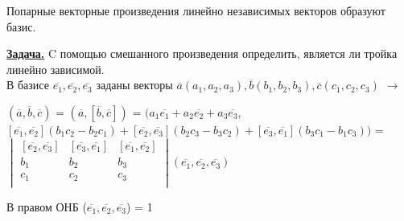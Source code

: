 \begin{corollary}
    Попарные векторные произведения линейно независимых векторов образуют базис.
\end{corollary}

\underline{\textbf{Задача.}} C помощью смешанного произведения определить, является ли тройка линейно зависимой.\\

В базисе $\overline{e_1}, \overline{e_2}, \overline{e_3}$ заданы векторы $\overline{a}(a_1, a_2, a_3), \overline{b}(b_1, b_2, b_3), \overline{c}(c_1, c_2, c_3)$ $\longrightarrow$

\begin{center}
    $(\overline{a}, \overline{b}, \overline{c})$ = $(\overline{a}, [\overline{b}, \overline{c}])$ = $(a_1\overline{e_1} + a_2\overline{e_2} + a_3\overline{e_3}$, $[\overline{e_1}, \overline{e_2}](b_1 c_2 - b_2 c_1) + [\overline{e_2}, \overline{e_3}](b_2 c_3 - b_3 c_2) + [\overline{e_3}, \overline{e_1}](b_3 c_1 - b_1 c_3))$ = 
        $\begin{vmatrix}
            [\overline{e_2}, \overline{e_3}] & [\overline{e_3}, \overline{e_1}] & [\overline{e_1}, \overline{e_2}]\\
            b_1 & b_2 & b_3\\
            c_1 & c_2 & c_3\\
        \end{vmatrix}(\overline{e_1}, \overline{e_2}, \overline{e_3})$
\end{center}

В правом ОНБ ($\overline{e_1}, \overline{e_2}, \overline{e_3}$) = 1

